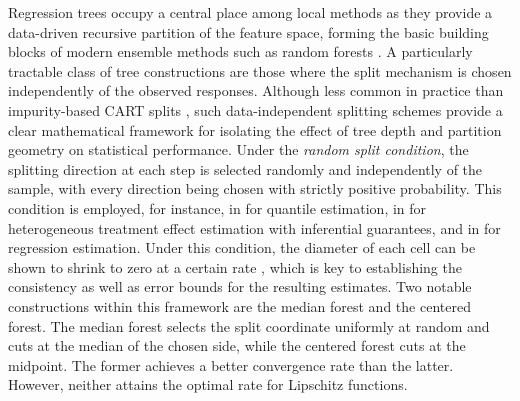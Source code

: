 \documentclass[paper=a4, fontsize=11pt]{scrartcl}
\begin{document}
  
Regression trees \cite{breiman1984classification} occupy a central place among local methods as they provide a data-driven recursive partition of the feature space, forming the basic building blocks of modern ensemble methods such as random forests \cite{breiman2001random,biau2016random}. A particularly tractable class of tree constructions are those where the split mechanism is chosen independently of the observed responses. Although less common in practice than impurity-based CART splits \cite{breiman1984classification}, such data-independent splitting schemes \cite{biau2012analysis,biau2016random} provide a clear mathematical framework for isolating the effect of tree depth and partition geometry on statistical performance. Under the \textit{random split condition}, the splitting direction at each step is selected randomly and independently of the sample, with every direction being chosen with strictly positive probability. This condition is employed, for instance, in \cite{meinshausen2006quantile} for quantile estimation, in \cite{wager2014asymptotic,wager2018estimation} for heterogeneous treatment effect estimation with inferential guarantees, and in \cite{biau2012analysis,duroux2018impact} for regression estimation. Under this condition, the diameter of each cell can be shown to shrink to zero \cite{meinshausen2006quantile,biau2012analysis} at a certain rate \cite{wager2018estimation,duroux2018impact}, which is key to establishing the consistency \cite{meinshausen2006quantile,biau2012analysis} as well as error bounds \cite{wager2018estimation,duroux2018impact} for the resulting estimates. Two notable constructions within this framework are the median forest and the centered forest. The median forest \cite{duroux2018impact} selects the split coordinate uniformly at random and cuts at the median of the chosen side, while the centered forest \cite{biau2012analysis} cuts at the midpoint. The former achieves a better convergence rate than the latter. However, neither attains the optimal rate for Lipschitz functions.
\end{document}
